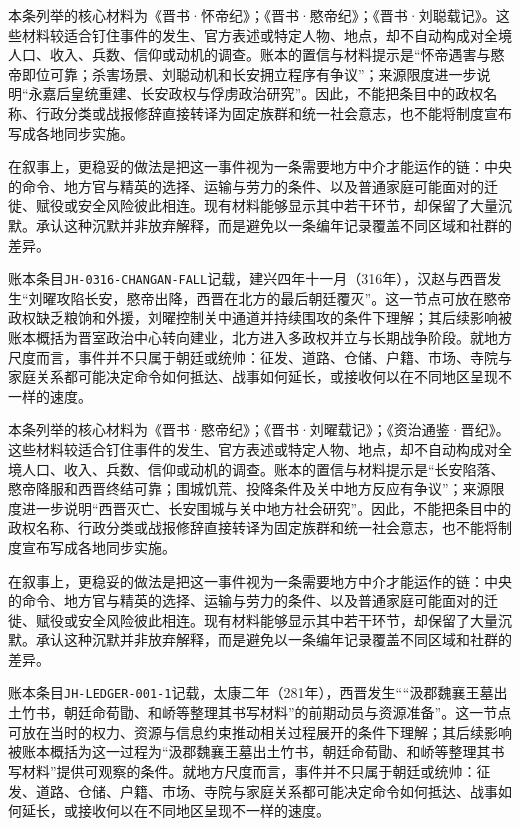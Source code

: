 本条列举的核心材料为《晋书·怀帝纪》；《晋书·愍帝纪》；《晋书·刘聪载记》。这些材料较适合钉住事件的发生、官方表述或特定人物、地点，却不自动构成对全境人口、收入、兵数、信仰或动机的调查。账本的置信与材料提示是“怀帝遇害与愍帝即位可靠；杀害场景、刘聪动机和长安拥立程序有争议”；来源限度进一步说明“永嘉后皇统重建、长安政权与俘虏政治研究”。因此，不能把条目中的政权名称、行政分类或战报修辞直接转译为固定族群和统一社会意志，也不能将制度宣布写成各地同步实施。

在叙事上，更稳妥的做法是把这一事件视为一条需要地方中介才能运作的链：中央的命令、地方官与精英的选择、运输与劳力的条件、以及普通家庭可能面对的迁徙、赋役或安全风险彼此相连。现有材料能够显示其中若干环节，却保留了大量沉默。承认这种沉默并非放弃解释，而是避免以一条编年记录覆盖不同区域和社群的差异。

账本条目\texttt{JH-0316-CHANGAN-FALL}记载，建兴四年十一月（316年），汉赵与西晋发生“刘曜攻陷长安，愍帝出降，西晋在北方的最后朝廷覆灭”。这一节点可放在愍帝政权缺乏粮饷和外援，刘曜控制关中通道并持续围攻的条件下理解；其后续影响被账本概括为晋室政治中心转向建业，北方进入多政权并立与长期战争阶段。就地方尺度而言，事件并不只属于朝廷或统帅：征发、道路、仓储、户籍、市场、寺院与家庭关系都可能决定命令如何抵达、战事如何延长，或接收何以在不同地区呈现不一样的速度。

本条列举的核心材料为《晋书·愍帝纪》；《晋书·刘曜载记》；《资治通鉴·晋纪》。这些材料较适合钉住事件的发生、官方表述或特定人物、地点，却不自动构成对全境人口、收入、兵数、信仰或动机的调查。账本的置信与材料提示是“长安陷落、愍帝降服和西晋终结可靠；围城饥荒、投降条件及关中地方反应有争议”；来源限度进一步说明“西晋灭亡、长安围城与关中地方社会研究”。因此，不能把条目中的政权名称、行政分类或战报修辞直接转译为固定族群和统一社会意志，也不能将制度宣布写成各地同步实施。

在叙事上，更稳妥的做法是把这一事件视为一条需要地方中介才能运作的链：中央的命令、地方官与精英的选择、运输与劳力的条件、以及普通家庭可能面对的迁徙、赋役或安全风险彼此相连。现有材料能够显示其中若干环节，却保留了大量沉默。承认这种沉默并非放弃解释，而是避免以一条编年记录覆盖不同区域和社群的差异。

账本条目\texttt{JH-LEDGER-001-1}记载，太康二年（281年），西晋发生““汲郡魏襄王墓出土竹书，朝廷命荀勖、和峤等整理其书写材料”的前期动员与资源准备”。这一节点可放在当时的权力、资源与信息约束推动相关过程展开的条件下理解；其后续影响被账本概括为这一过程为“汲郡魏襄王墓出土竹书，朝廷命荀勖、和峤等整理其书写材料”提供可观察的条件。就地方尺度而言，事件并不只属于朝廷或统帅：征发、道路、仓储、户籍、市场、寺院与家庭关系都可能决定命令如何抵达、战事如何延长，或接收何以在不同地区呈现不一样的速度。

